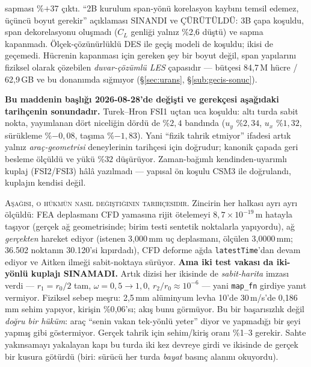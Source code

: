 \documentclass[11pt,a4paper]{article}
\begin{document}
\begin{description}
        sapması \%$+$37 çıktı. ``2B kurulum span-yönü korelasyon kaybını
        temsil edemez, üçüncü boyut gerekir'' açıklaması SINANDI ve
        ÇÜRÜTÜLDÜ: 3B çapa koşuldu, span dekorelasyonu oluşmadı
        ($C_L$ genliği yalnız \%2{,}6 düştü) ve sapma kapanmadı.
        Ölçek-çözünürlüklü DES ile geçiş modeli de koşuldu; ikisi de
        geçemedi. Hücrenin kapanması için gereken şey bir boyut değil,
        span yapılarını fiziksel olarak çözebilen \emph{duvar-çözümlü LES}
        çapasıdır --- bütçesi 84{,}7\,M hücre / 62{,}9\,GB ve bu donanımda
        sığmıyor (\S\ref{sec:urans}, \S\ref{sub:gecis-sonuc}).
  \item[2-yönlü FSI --- kararlı vaka doğrulandı, zaman-bağımlı açık.]
        \label{sec:fsi2}
        \textbf{Bu maddenin başlığı 2026-08-28'de değişti ve gerekçesi
        aşağıdaki tarihçenin sonundadır.} Turek--Hron FSI1 uçtan uca
        koşuldu: altı turda sabit nokta, yayımlanan dört niceliğin dördü de
        \%$2{,}4$ bandında ($u_y$ \%$2{,}34$, $u_x$ \%$1{,}32$, sürükleme
        \%$-0{,}08$, taşıma \%$-1{,}83$). Yani ``fizik tahrik etmiyor''
        ifadesi artık yalnız \emph{araç-geometrisi} deneylerinin tarihçesi
        için doğrudur; kanonik çapada geri besleme ölçüldü ve yükü
        \%$32$ düşürüyor. Zaman-bağımlı kendinden-uyarımlı kuplaj
        (FSI2/FSI3) hâlâ yazılmadı --- yapısal ön koşulu CSM3 ile
        doğrulandı, kuplajın kendisi değil.

        \medskip
        \noindent\textsc{Aşağısı, o hükmün nasıl değiştiğinin tarihçesidir.}
        Zincirin her halkası ayrı ayrı ölçüldü: FEA deplasmanı CFD yamasına
        rijit ötelemeyi $8{,}7\times10^{-19}$\,m hatayla taşıyor (gerçek ağ
        geometrisinde; birim testi sentetik noktalarla yapıyordu), ağ
        \emph{gerçekten} hareket ediyor (istenen 3{,}000\,mm uç deplasmanı,
        ölçülen 3{,}0000\,mm; 36.502 noktanın 30.120'si kıpırdadı), CFD
        deforme ağda \texttt{latestTime}'dan devam ediyor ve Aitken ilmeği
        sabit-noktaya sürüyor. \textbf{Ama iki test vakası da iki-yönlü
        kuplajı SINAMADI.} Artık dizisi her ikisinde de \emph{sabit-harita}
        imzası verdi --- $r_1 = r_0/2$ tam, $\omega = 0{,}5 \rightarrow 1{,}0$,
        $r_2/r_0 \approx 10^{-6}$ --- yani \texttt{map\_fn} girdiye yanıt
        vermiyor. Fiziksel sebep meşru: 2{,}5\,mm alüminyum levha 10\textdegree{}'de
        30\,m/s'de 0{,}186\,mm sehim yapıyor, kirişin \%0{,}06'sı; akış bunu
        görmüyor. Bu bir başarısızlık değil \emph{doğru bir hüküm}: araç
        ``senin vakan tek-yönlü yeter'' diyor ve yapmadığı bir şeyi yapmış
        gibi göstermiyor. Gerçek tahrik için sehim/kiriş oranı \%1--3 gerekir.
        Sahte yakınsamayı yakalayan kapı bu turda iki kez devreye girdi ve
        ikisinde de gerçek bir kusura götürdü (biri: sürücü her turda
        \emph{bayat} basınç alanını okuyordu).


\end{description}
\end{document}
